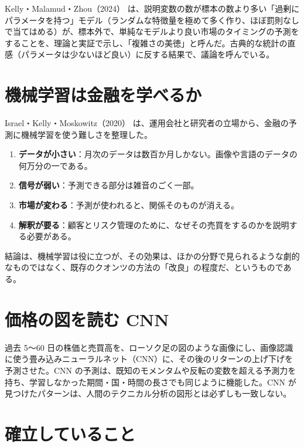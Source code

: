 Kelly・Malamud・Zhou（2024）\cite{kmz2024} は、説明変数の数が標本の数より多い「過剰にパラメータを持つ」モデル（ランダムな特徴量を極めて多く作り、ほぼ罰則なしで当てはめる）が、標本外で、単純なモデルより良い市場のタイミングの予測をすることを、理論と実証で示し、「複雑さの美徳」と呼んだ。古典的な統計の直感（パラメータは少ないほど良い）に反する結果で、議論を呼んでいる。

\section{機械学習は金融を学べるか}

Israel・Kelly・Moskowitz（2020）\cite{ikm2020} は、運用会社と研究者の立場から、金融の予測に機械学習を使う難しさを整理した。

\begin{enumerate}
\item \textbf{データが小さい}：月次のデータは数百か月しかない。画像や言語のデータの何万分の一である。
\item \textbf{信号が弱い}：予測できる部分は雑音のごく一部。
\item \textbf{市場が変わる}：予測が使われると、関係そのものが消える。
\item \textbf{解釈が要る}：顧客とリスク管理のために、なぜその売買をするのかを説明する必要がある。
\end{enumerate}

結論は、機械学習は役に立つが、その効果は、ほかの分野で見られるような劇的なものではなく、既存のクオンツの方法の「改良」の程度だ、というものである。

\section{価格の図を読む CNN}

\begin{paperbox}
過去 5〜60 日の株価と売買高を、ローソク足の図のような画像にし、画像認識に使う畳み込みニューラルネット（CNN）に、その後のリターンの上げ下げを予測させた。CNN の予測は、既知のモメンタムや反転の変数を超える予測力を持ち、学習しなかった期間・国・時間の長さでも同じように機能した。CNN が見つけたパターンは、人間のテクニカル分析の図形とは必ずしも一致しない。
\end{paperbox}

\section{確立していること}

